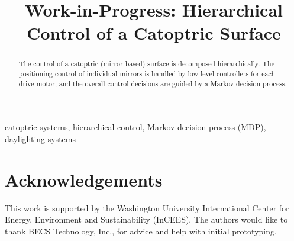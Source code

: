 \documentclass[conference]{IEEEtran}
\begin{document}
\title{Work-in-Progress: Hierarchical Control of a Catoptric Surface}


\author{
}

\maketitle

\begin{abstract}
The control of a catoptric (mirror-based) surface is decomposed
hierarchically. The positioning control of individual mirrors
is handled by low-level controllers for each drive motor, and the
overall control decisions are guided by a Markov decision process.
\end{abstract}

\begin{IEEEkeywords}
catoptric systems, hierarchical control, Markov decision process (MDP), daylighting systems
\end{IEEEkeywords}







\section*{Acknowledgements}
This work is supported by the Washington University International Center for
Energy, Environment and Sustainability (InCEES).
The authors would like to thank BECS Technology, Inc., for advice and help
with initial prototyping.



\end{document}
